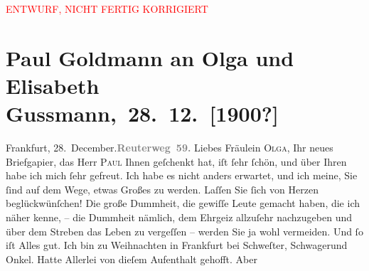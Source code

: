 
\begin{center}
            \textcolor{red}{ENTWURF, NICHT FERTIG KORRIGIERT}
                      \end{center}
            
         
         \renewcommand{\erwaehntePersonen}{Personen: Peter Altenberg, Clementine Goldmann, Fedor Mamroth, Paul Marx, Guy de Maupassant, Vally Rosengart, Josef Rosengart, Olga Schnitzler, Elisabeth Steinrück}
         \renewcommand{\erwaehnteOrte}{Orte: Berlin, Frankfurt am Main, Reuterweg, Wien}
         \renewcommand{\erwaehnteWerke}{Werke: Rosenmontag}
               \section[ Paul Goldmann an Olga und Elisabeth Gussmann, 28. 12. {[}1900?{]}]{ Paul Goldmann an Olga und Elisabeth Gussmann, 28. 12. {[}1900?{]}}\nopagebreak{}\rehead{ }\begin{ledgroupsized}[t]{13cm}\normalsize\beginnumbering \toendnotes[C]{\smallbreak\pagebreak[2]} 
\toendnotes[C]{\smallbreak}\pstart
           \noindent{}Frankfurt, 28. December.\hfill {\pb}\textcolor{gray}{\textbf{Reuterweg 59.}}\pend
           \pstart\center{}Liebes Fräulein \textsc{Olga},\pend\pstart
           Ihr neues Briefgapier, das Herr \textsc{Paul} Ihnen geſchenkt hat, iſt ſehr ſchön, und über Ihren \label{K_L03538-1v}\label{K_L03538-1h} habe ich mich ſehr gefreut. Ich habe es nicht anders erwartet, und ich meine,
               Sie ſind auf dem Wege, etwas Großes zu werden. Laſſen Sie ſich von Herzen
               beglückwünſchen! Die große Dummheit, die gewiſſe Leute gemacht haben, die ich näher
               kenne, – die Dummheit nämlich, dem Ehrgeiz allzuſehr nachzugeben und über dem Streben
               das Leben zu vergeſſen – werden Sie ja wohl vermeiden. Und ſo iſt Alles gut. Ich bin
               zu Weihnachten in Frankfurt bei Schweſter, Schwagerund Onkel. Hatte Allerlei von dieſem Aufenthalt gehofft. Aber

\end{ledgroupsized}
